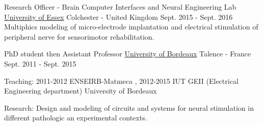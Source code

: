 \begin{cventries}
  \cventry
    {Research Officer - Brain Computer Interfaces and Neural Engineering Lab} %
    {\href{https://www.essex.ac.uk/departments/computer-science-and-electronic-engineering/research/brain-computer-interfaces-and-neural-engineering}{University of Essex}} %
    {Colchester - United Kingdom} %
    {Sept. 2015 - Sept. 2016} %
    {
      Multiphics modeling of micro-electrode implantation and electrical stimulation of peripheral nerve for sensorimotor rehabilitation.
    }

  \cventry
    {PhD student then Assistant Professor} %
    {\href{https://www.u-bordeaux.fr}{University of Bordeaux}} %
    {Talence - France} %
    {Sept. 2011 - Sept. 2015} %
    {
      \begin{cvitems} %
        \item {Teaching: 2011-2012 ENSEIRB-Matmeca , 2012-2015 IUT GEII (Electrical Engineering department) University of Bordeaux}
        \item {Research: Design and modeling of circuits and systems for neural stimulation in different pathologic an experimental contexts.}
      \end{cvitems}
    }

\end{cventries}
